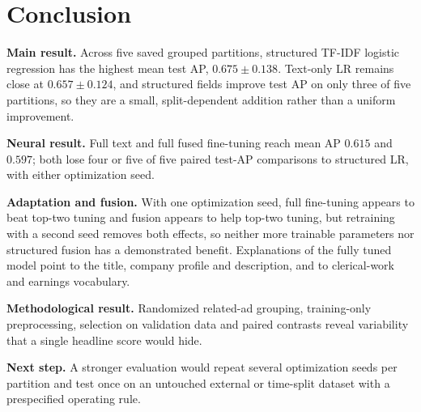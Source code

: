 \section{Conclusion}
\label{conclusion}

\textbf{Main result.} Across five saved grouped partitions, structured TF-IDF logistic regression
has the highest mean test AP, $0.675 \pm 0.138$. Text-only LR remains close at $0.657 \pm 0.124$, and
structured fields improve test AP on only three of five partitions, so they are a small,
split-dependent addition rather than a uniform improvement.

\textbf{Neural result.} Full text and full fused fine-tuning reach mean AP $0.615$ and $0.597$; both
lose four or five of five paired test-AP comparisons to structured LR, with either optimization seed.

\textbf{Adaptation and fusion.} With one optimization seed, full fine-tuning appears to beat top-two
tuning and fusion appears to help top-two tuning, but retraining with a second seed removes both
effects, so neither more trainable parameters nor structured fusion has a demonstrated benefit.
Explanations of the fully tuned model point to the title, company profile and description, and to
clerical-work and earnings vocabulary.

\textbf{Methodological result.} Randomized related-ad grouping, training-only preprocessing,
selection on validation data and paired contrasts reveal variability that a single headline score
would hide.

\textbf{Next step.} A stronger evaluation would repeat several optimization seeds per partition and
test once on an untouched external or time-split dataset with a prespecified operating rule.
